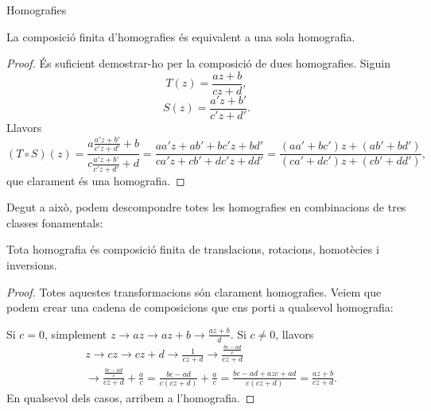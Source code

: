 \documentclass[dvipsnames, svgnames, leqno, a4paper, 12pt]{report}
\begin{document}
\begin{chapter}{Homografies}
        \begin{proposition}\label{prop:comp_homo}
            La composició finita d'homografies és equivalent a una sola homografia.
        \end{proposition}

        \begin{proof}
            És suficient demostrar-ho per la composició de dues homografies. Siguin 
            \begin{displaymath}
                T(z)=\frac{az+b}{cz+d},
            \end{displaymath}
            \begin{displaymath}
                S(z)=\frac{a'z+b'}{c'z+d'}.
            \end{displaymath}
            Llavors
            \begin{displaymath}
                (T\circ S)(z)=\frac{a\frac{a'z+b'}{c'z+d'}+b}{c\frac{a'z+b'}{c'z+d'}+d}=\frac{aa'z+ab'+bc'z+bd'}{ca'z+cb'+dc'z+dd'}=\frac{\left( aa'+bc' \right)z+(ab'+bd')}{\left( ca'+dc' \right)z+(cb'+dd')},
            \end{displaymath}
            \normalsize
            que clarament és una homografia.
        \end{proof}

        Degut a això, podem descompondre totes les homografies en combinacions de tres classes fonamentals:
        
        \begin{theorem}
            Tota homografia és composició finita de translacions, rotacions, homotècies i inversions.
        \end{theorem}
        
        \begin{proof}
            Totes aquestes transformacions són clarament homografies. Veiem que podem crear una cadena de composicions que ens porti a qualsevol homografia:
            
            Si $c=0$, simplement $z\to az\to az+b\to \frac{az+b}{d}$. Si $c\neq0$, llavors 
            \begin{align*}
                &z\to cz\to cz+d\to \frac{1}{cz+d}\to \frac{\frac{bc-ad}{c}}{cz+d}\\
                &\to \frac{\frac{bc-ad}{c}}{cz+d}+\frac{a}{c}=\frac{bc-ad}{c(cz+d)}+\frac{a}{c}=\frac{bc-ad+azc+ad}{c(cz+d)}=\frac{az+b}{cz+d}.
            \end{align*}
            En qualsevol dels casos, arribem a l'homografia.
        \end{proof}


\end{chapter}
\end{document}
